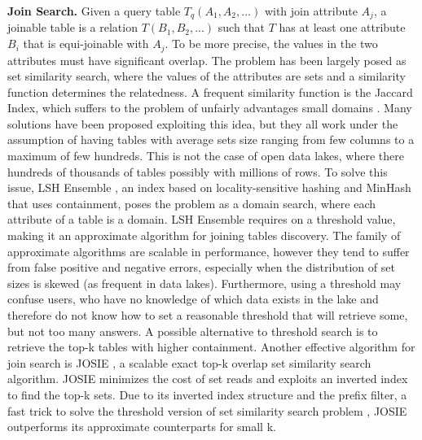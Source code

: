 \textbf{Join Search.} Given a query table $T_q(A_1,A_2,...)$ with join attribute $A_j$, a joinable table is a relation $T(B_1, B_2,...)$ such that $T$ has at least one attribute $B_i$ that is equi-joinable with $A_j$. To be more precise, the values in the two attributes must have significant overlap. The problem has been largely posed as set similarity search, where the values of the attributes are sets and a similarity function determines the relatedness. A frequent similarity function is the Jaccard Index, which suffers to the problem of unfairly advantages small domains \cite{zhu2016lsh}. Many solutions have been proposed exploiting this idea, but they all work under the assumption of having tables with average sets size ranging from few columns to a maximum of few hundreds. This is not the case of open data lakes, where there hundreds of thousands of tables possibly with millions of rows. To solve this issue,  LSH Ensemble \cite{zhu2016lsh}, an index based on locality-sensitive hashing \cite{gionis1999similarity} and MinHash \cite{indyk1998approximate} that uses containment, poses the problem as a domain search, where each attribute of a table is a domain. LSH Ensemble requires on a threshold value, making it an approximate algorithm for joining tables discovery. The family of approximate algorithms are scalable in performance, however they tend to suffer from false positive and negative errors, especially when the distribution of set sizes is skewed (as frequent in data lakes). Furthermore, using a threshold may confuse users, who have no knowledge of which data exists in the lake and therefore do not know how to set a reasonable threshold that will retrieve some, but not too many answers. A possible alternative to threshold search is to retrieve the top-k tables with higher containment. Another effective algorithm for join search is JOSIE \cite{zhu2019josie}, a scalable exact top-k overlap set similarity search algorithm. JOSIE minimizes the cost of set reads and exploits an inverted index to find the top-k sets. Due to its inverted index structure and the prefix filter, a fast trick to solve the threshold version of set similarity search problem \cite{chaudhuri2006primitive}, JOSIE outperforms its approximate counterparts for small k.
\bigbreak


